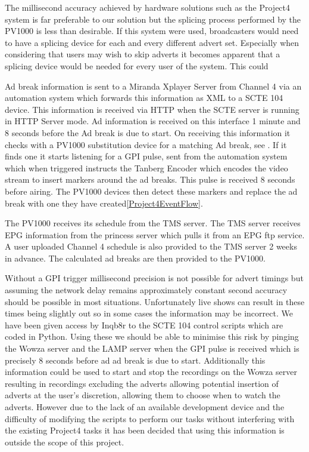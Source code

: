 	The millisecond accuracy achieved by hardware solutions such as the Project4 system is far preferable to our solution but the splicing process performed by the PV1000 is less than desirable. If this system were used, broadcasters would need to have a splicing device for each and every different advert set. Especially when considering that users may wish to skip adverts it becomes apparent that a splicing device would be needed for every user of the system. This could 

	Ad break information is sent to a Miranda Xplayer Server from Channel 4 via an automation system which forwards this information as XML to a SCTE 104 device. This information is received via HTTP when the SCTE server is running in HTTP Server mode. Ad information is received on this interface 1 minute and 8 seconds before the Ad break is due to start. On receiving this information it checks with a PV1000 substitution device for a matching Ad break, see \citep{PV1000Schedule}. If it finds one it starts listening for a GPI pulse, sent from the automation system which when triggered instructs the Tanberg Encoder which encodes the video stream to insert markers around the ad breaks. This pulse is received 8 seconds before airing. The PV1000 devices then detect these markers and replace the ad break with one they have created\ref{Project4EventFlow}.

	The PV1000 receives its schedule from the TMS server. The TMS server receives EPG information from the princess server which pulls it from an EPG ftp service. A user uploaded Channel 4 schedule is also provided to the TMS server 2 weeks in advance. The calculated ad breaks are then provided to the PV1000.

	Without a GPI trigger millisecond precision is not possible for advert timings but assuming the network delay remains approximately constant second accuracy should be possible in most situations. Unfortunately live shows can result in these times being slightly out so in some cases the information may be incorrect. We have been given access by Inqb8r to the SCTE 104 control scripts which are coded in Python. Using these we should be able to minimise this risk by pinging the Wowza server and the LAMP server when the GPI pulse is received which is precisely 8 seconds before ad ad break is due to start. Additionally this information could be used to start and stop the recordings on the Wowza server resulting in recordings excluding the adverts allowing potential insertion of adverts at the user's discretion, allowing them to choose when to watch the adverts. However due to the lack of an available development device and the difficulty of modifying the scripts to perform our tasks without interfering with the existing Project4 tasks it has been decided that using this information is outside the scope of this project.

